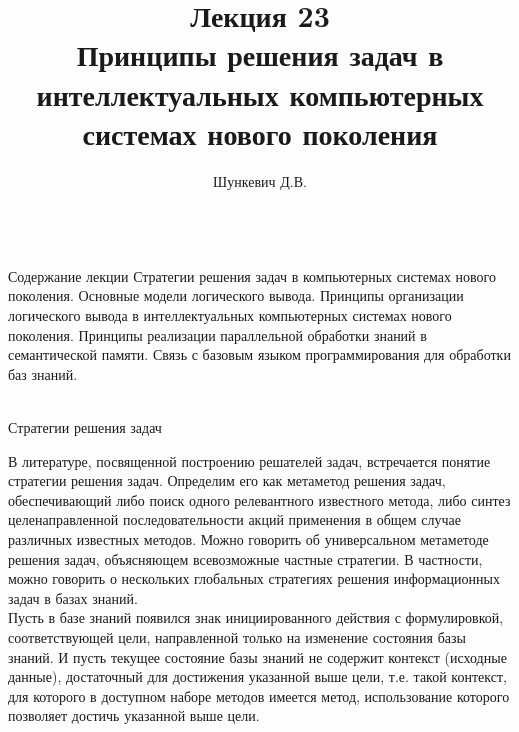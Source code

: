 \title{Лекция 23\\Принципы решения задач в интеллектуальных компьютерных системах нового поколения}
\author[]{Шункевич Д.В.}

\begin{frame}
	\titlepage
\end{frame}

\begin{frame}{\\Содержание лекции}
	\topline
	\justifying
	Стратегии решения задач в компьютерных системах нового поколения. Основные модели логического вывода. Принципы организации логического вывода в интеллектуальных компьютерных системах нового поколения. Принципы реализации параллельной обработки знаний в семантической памяти. Связь с базовым языком программирования для обработки баз знаний. 
\end{frame}

\begin{frame}{\\Стратегии решения задач}
\topline
\justifying
\vspace{10mm}
 
    В литературе, посвященной построению решателей задач, встречается понятие стратегии решения задач. Определим его как метаметод решения задач, обеспечивающий либо поиск одного релевантного известного метода, либо синтез целенаправленной последовательности акций применения в общем случае различных известных методов. Можно говорить об универсальном метаметоде решения задач, объясняющем всевозможные частные стратегии. В частности, можно говорить о нескольких глобальных стратегиях решения информационных задач в базах знаний.\\
    Пусть в базе знаний появился знак инициированного действия с формулировкой, соответствующей цели, направленной только на изменение состояния базы знаний. И пусть текущее состояние базы знаний не содержит контекст (исходные данные), достаточный для достижения указанной выше цели, т.е. такой контекст, для которого в доступном наборе методов имеется метод, использование которого позволяет достичь указанной выше цели.
\end{frame}


